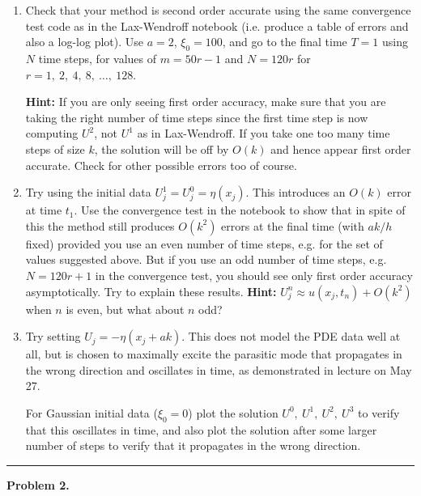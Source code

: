 \documentclass[10pt]{article}
\begin{document}
\begin{enumerate} 
\item Check that your method is second order accurate using the same
convergence test code as in the Lax-Wendroff notebook (i.e. produce a table
of errors and also a log-log plot).  
Use $a=2$, $\xi_0=100$, and go to the final time $T=1$ using $N$ time steps, for 
values of $m = 50r -1$ and $N=120r$ for $r = 1,~2,~4,~8,~\ldots,~128$.

{\bf Hint:} If you are only seeing
first order accuracy, make sure that you are taking the right number of time
steps since the first time step is now computing $U^2$, not $U^1$ as in
Lax-Wendroff.  If you take one too many time steps of size $k$, 
the solution will be off
by $O(k)$ and hence appear first order accurate.  Check for other possible
errors too of course.

\item Try using the initial data $U_j^1 = U_j^0 = \eta(x_j)$.  This
introduces an $O(k)$ error at time $t_1$.  Use the convergence test in the
notebook to show that in spite of this the method still produces
$O(k^2)$ errors at the final time (with $ak/h$ fixed) provided you use an
even number of time steps,  e.g. for the set of values suggested above.
But if you use an odd number of time steps, e.g. $N = 120r +1$ in
the convergence test, you should see only first order accuracy
asymptotically.   Try to explain these results.
{\bf Hint:} $U_j^n \approx u(x_j,t_n) + O(k^2)$ when $n$ is even, but what
about $n$ odd?

\newpage

\item Try setting $U_j = -\eta(x_j + ak)$.  This does not model the PDE data
well at all, but is chosen to maximally excite the parasitic mode that
propagates in the wrong direction and oscillates in time, as demonstrated in
lecture on May 27.  

For Gaussian initial data ($\xi_0=0$) plot the solution
$U^0,~U^1,~U^2,~U^3$ to verify that this oscillates in time, and also plot the
solution after some larger number of steps to verify that it propagates in the
wrong direction.

\end{enumerate} 






\vskip 1cm
\hrule
{\bf Problem 2.}  
\end{document}
